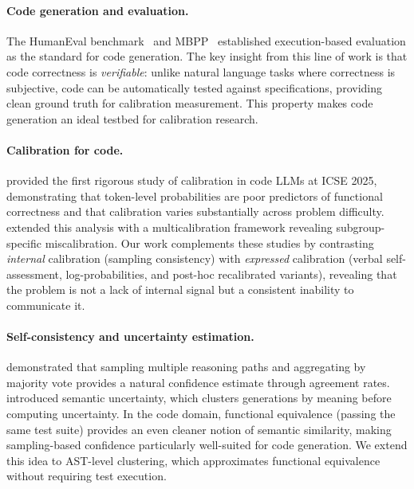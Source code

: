 \documentclass{article}
\begin{document}
\paragraph{Code generation and evaluation.}
The HumanEval benchmark~\citep{chen2021evaluating} and MBPP~\citep{austin2021program} established execution-based evaluation as the standard for code generation. The key insight from this line of work is that code correctness is \emph{verifiable}: unlike natural language tasks where correctness is subjective, code can be automatically tested against specifications, providing clean ground truth for calibration measurement. This property makes code generation an ideal testbed for calibration research.

\paragraph{Calibration for code.}
\citet{spiess2025calibration} provided the first rigorous study of calibration in code LLMs at ICSE 2025, demonstrating that token-level probabilities are poor predictors of functional correctness and that calibration varies substantially across problem difficulty. \citet{campos2025multicalibration} extended this analysis with a multicalibration framework revealing subgroup-specific miscalibration. Our work complements these studies by contrasting \emph{internal} calibration (sampling consistency) with \emph{expressed} calibration (verbal self-assessment, log-probabilities, and post-hoc recalibrated variants), revealing that the problem is not a lack of internal signal but a consistent inability to communicate it.

\paragraph{Self-consistency and uncertainty estimation.}
\citet{wang2023selfconsistency} demonstrated that sampling multiple reasoning paths and aggregating by majority vote provides a natural confidence estimate through agreement rates. \citet{kuhn2023semantic} introduced semantic uncertainty, which clusters generations by meaning before computing uncertainty. In the code domain, functional equivalence (passing the same test suite) provides an even cleaner notion of semantic similarity, making sampling-based confidence particularly well-suited for code generation. We extend this idea to AST-level clustering, which approximates functional equivalence without requiring test execution.
\end{document}
